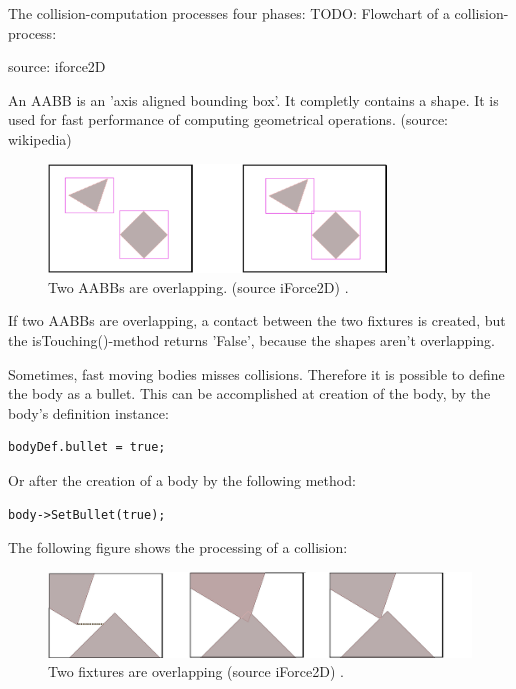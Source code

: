 \documentclass[10pt,a4paper,DIV=11]{scrreprt}
\begin{document}
The collision-computation processes four phases:
TODO: Flowchart of a collision-process:


source: iforce2D


An AABB is an 'axis aligned bounding box'. It completly contains a shape. It is used for fast performance of computing geometrical operations. (source: wikipedia)

\begin{center}
	\begin{figure}[H]
		\centering
		\includegraphics[width=0.8\textwidth,scale=1.0]{files/aabbs-crossing.png}  
		\caption{Two AABBs are overlapping. (source iForce2D) \cite{box2d-iforce}.}
		\label{fig:aabbs}
	\end{figure}
\end{center}
If two AABBs are overlapping, a contact between the two fixtures is created, but the isTouching()-method returns 'False', because the shapes aren't overlapping.

Sometimes, fast moving bodies misses collisions. Therefore it is possible to define the body as a bullet.
This can be accomplished at creation of the body, by the body's definition instance:

\begin{lstlisting}[caption={Define fixture as bullet before creation},label=lst:fixture-bullet-before]
bodyDef.bullet = true;
\end{lstlisting}

Or after the creation of a body by the following method:

\begin{lstlisting}[caption={Define fixture as bullet after creation},label=lst:fixture-bullet-after]
body->SetBullet(true);
\end{lstlisting}

The following figure shows the processing of a collision:

\begin{center}
	\begin{figure}[H]
		\centering
		\includegraphics[width=1.0\textwidth,scale=1.0]{files/fixtures-overlap.png}
		\caption{Two fixtures are overlapping (source iForce2D) \cite{box2d-iforce}.}
		\label{fig:fixture-overlap}
	\end{figure}
\end{center}
\end{document}
